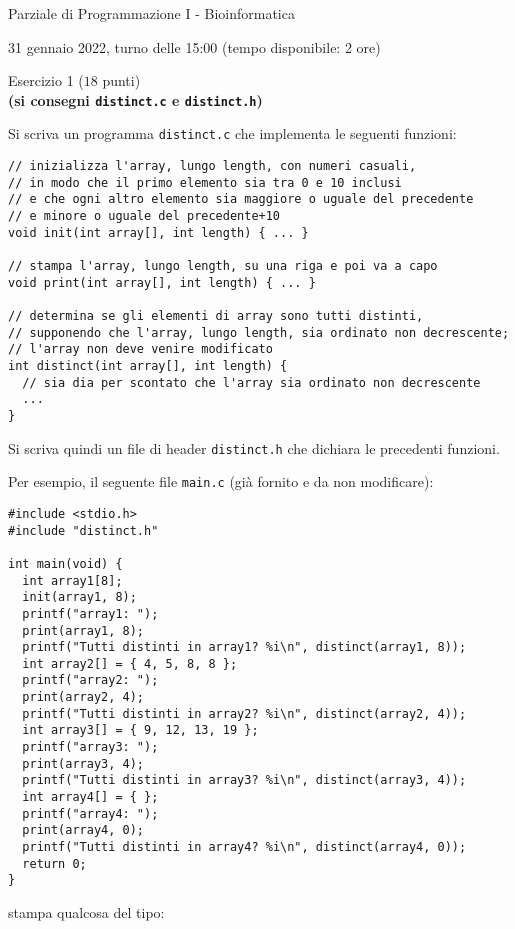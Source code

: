 \documentclass[12pt]{article}
\begin{document}
\begin{center}{\LARGE Parziale di Programmazione I - Bioinformatica}\\
\begin{center}
  \large 31 gennaio 2022, turno delle 15:00 (tempo disponibile: 2 ore)
\end{center}
\end{center}

\vspace*{1ex}
\begin{center}{\Large Esercizio 1} ($18$ punti)\\
  \textbf{(si consegni \texttt{distinct.c} e \texttt{distinct.h})}
\end{center}

Si scriva un programma \texttt{distinct.c} che implementa le seguenti funzioni:

\begin{center}
\begin{lstlisting}[language=myC]
// inizializza l'array, lungo length, con numeri casuali,
// in modo che il primo elemento sia tra 0 e 10 inclusi
// e che ogni altro elemento sia maggiore o uguale del precedente
// e minore o uguale del precedente+10
void init(int array[], int length) { ... }

// stampa l'array, lungo length, su una riga e poi va a capo
void print(int array[], int length) { ... }

// determina se gli elementi di array sono tutti distinti,
// supponendo che l'array, lungo length, sia ordinato non decrescente;
// l'array non deve venire modificato
int distinct(int array[], int length) {
  // sia dia per scontato che l'array sia ordinato non decrescente
  ...
}
\end{lstlisting}
\end{center}
%
Si scriva quindi un file di header \texttt{distinct.h} che dichiara le precedenti funzioni.

Per esempio, il seguente file \texttt{main.c}
(gi\`a fornito e da non modificare):

\begin{center}
  \begin{lstlisting}[language=myC]
#include <stdio.h>
#include "distinct.h"

int main(void) {
  int array1[8];
  init(array1, 8);
  printf("array1: ");
  print(array1, 8);
  printf("Tutti distinti in array1? %i\n", distinct(array1, 8));
  int array2[] = { 4, 5, 8, 8 };
  printf("array2: ");
  print(array2, 4);
  printf("Tutti distinti in array2? %i\n", distinct(array2, 4));
  int array3[] = { 9, 12, 13, 19 };
  printf("array3: ");
  print(array3, 4);
  printf("Tutti distinti in array3? %i\n", distinct(array3, 4));
  int array4[] = { };
  printf("array4: ");
  print(array4, 0);
  printf("Tutti distinti in array4? %i\n", distinct(array4, 0));
  return 0;
}
  \end{lstlisting}
\end{center}
stampa qualcosa del tipo:
\end{document}
